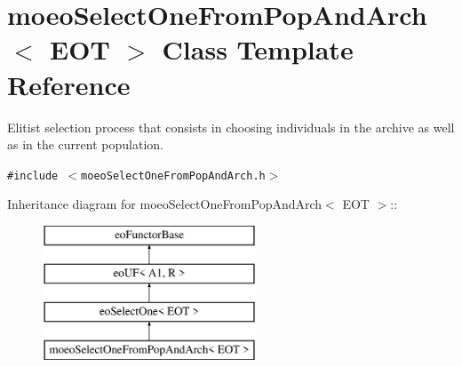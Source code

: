 \section{moeo\-Select\-One\-From\-Pop\-And\-Arch$<$ EOT $>$ Class Template Reference}
\label{classmoeoSelectOneFromPopAndArch}
Elitist selection process that consists in choosing individuals in the archive as well as in the current population.  


{\tt \#include $<$moeo\-Select\-One\-From\-Pop\-And\-Arch.h$>$}

Inheritance diagram for moeo\-Select\-One\-From\-Pop\-And\-Arch$<$ EOT $>$::\begin{figure}[H]
\begin{center}
\leavevmode
\includegraphics[height=4cm]{classmoeoSelectOneFromPopAndArch}
\end{center}
\end{figure}
